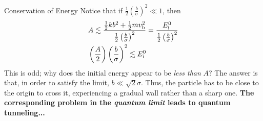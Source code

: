 \documentclass{beamer}
\begin{document}
\begin{frame}{Conservation of Energy}
\small Notice that if $\frac{1}{2}\left(\frac{b}{\sigma}\right)^2 \ll 1$, then \ \\ \vspace{0.5cm}
\begin{align}
A \lesssim \frac{\frac{1}{2}kb^2 + \frac{1}{2}m v_{\rm b}^2}{\frac{1}{2}\left(\frac{b}{\sigma}\right)^2} &= \frac{E_{\rm i}^0}{\frac{1}{2}\left(\frac{b}{\sigma}\right)^2} \\
\left(\frac{A}{2}\right)\left(\frac{b}{\sigma}\right)^2 \lesssim E_{\rm i}^0
\end{align}
This is odd; why does the initial energy \alert{appear to be \textit{less than} $A$?}  The answer is that, in order to satisfy the limit, $b \ll \sqrt{2}\sigma$.  Thus, the particle has to be close to the origin to cross it, experiencing a gradual wall rather than a sharp one.  \textbf{The corresponding problem in the \textit{quantum limit} leads to quantum tunneling...} 
\end{frame}
\end{document}
